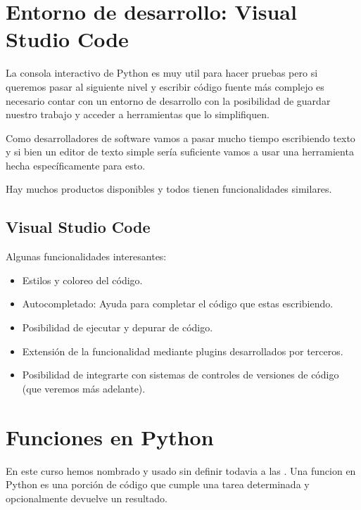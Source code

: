 \documentclass[a5paper,9pt,spanish]{sphinxmanual}
\begin{document}
\sphinxstepscope


\chapter{Entorno de desarrollo: Visual Studio Code}
\label{\detokenize{vscode:entorno-de-desarrollo-visual-studio-code}}\label{\detokenize{vscode::doc}}
\sphinxAtStartPar
La consola interactivo de Python es muy util para hacer pruebas pero si
queremos pasar al siguiente nivel y escribir código fuente más complejo
es necesario contar con un entorno de desarrollo con la posibilidad de
guardar nuestro trabajo y acceder a herramientas que lo simplifiquen.

\sphinxAtStartPar
Como desarrolladores de software vamos a pasar mucho tiempo escribiendo
texto y si bien un editor de texto simple sería suficiente vamos a usar
una herramienta hecha específicamente para esto.

\sphinxAtStartPar
Hay muchos productos disponibles y todos tienen funcionalidades similares.


\section{Visual Studio Code}
\label{\detokenize{vscode:visual-studio-code}}
\noindent{}

\sphinxAtStartPar
Algunas funcionalidades interesantes:
\begin{itemize}
\item {} 
\sphinxAtStartPar
Estilos y coloreo del código.

\item {} 
\sphinxAtStartPar
Autocompletado: Ayuda para completar el código que estas escribiendo.

\item {} 
\sphinxAtStartPar
Posibilidad de ejecutar y depurar de código.

\item {} 
\sphinxAtStartPar
Extensión de la funcionalidad mediante plugins desarrollados por terceros.

\item {} 
\sphinxAtStartPar
Posibilidad de integrarte con sistemas de controles de versiones de
código (que veremos más adelante).

\end{itemize}

\sphinxstepscope


\chapter{Funciones en Python}
\label{\detokenize{fn:funciones-en-python}}\label{\detokenize{fn::doc}}
\sphinxAtStartPar
En este curso hemos nombrado y usado sin definir todavia a las .
Una funcion en Python es una porción de código que cumple una tarea determinada
y opcionalmente devuelve un resultado.
\end{document}

